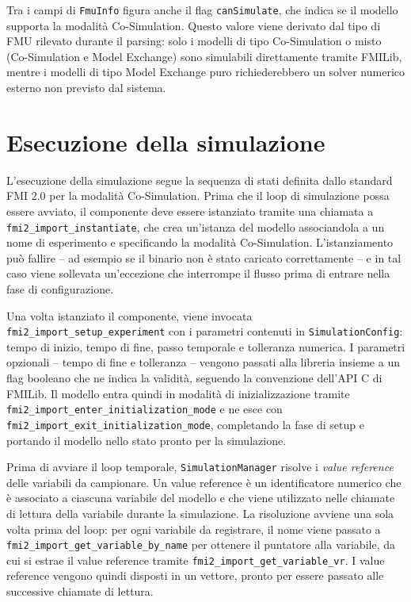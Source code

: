Tra i campi di \texttt{FmuInfo} figura anche il flag \texttt{canSimulate}, che indica se il modello supporta la modalità Co-Simulation. Questo valore viene derivato dal tipo di FMU rilevato durante il parsing: solo i modelli di tipo Co-Simulation o misto (Co-Simulation e Model Exchange) sono simulabili direttamente tramite FMILib, mentre i modelli di tipo Model Exchange puro richiederebbero un solver numerico esterno non previsto dal sistema.

\section{Esecuzione della simulazione}
\label{sec:impl-simulazione}

L'esecuzione della simulazione segue la sequenza di stati definita dallo standard FMI 2.0 per la modalità Co-Simulation. Prima che il loop di simulazione possa essere avviato, il componente deve essere istanziato tramite una chiamata a\\\texttt{fmi2\_import\_instantiate}, che crea un'istanza del modello associandola a un nome di esperimento e specificando la modalità Co-Simulation. L'istanziamento può fallire -- ad esempio se il binario non è stato caricato correttamente -- e in tal caso viene sollevata un'eccezione che interrompe il flusso prima di entrare nella fase di configurazione.

Una volta istanziato il componente, viene invocata\\\texttt{fmi2\_import\_setup\_experiment} con i parametri contenuti in \texttt{SimulationConfig}: tempo di inizio, tempo di fine, passo temporale e tolleranza numerica. I parametri opzionali -- tempo di fine e tolleranza -- vengono passati alla libreria insieme a un flag booleano che ne indica la validità, seguendo la convenzione dell'API C di FMILib. Il modello entra quindi in modalità di inizializzazione tramite \texttt{fmi2\_import\_enter\_initialization\_mode} e ne esce con\\\texttt{fmi2\_import\_exit\_initialization\_mode}, completando la fase di setup e portando il modello nello stato pronto per la simulazione.

Prima di avviare il loop temporale, \texttt{SimulationManager} risolve i \textit{value reference} delle variabili da campionare. Un value reference è un identificatore numerico che è associato a ciascuna variabile del modello e che viene utilizzato nelle chiamate di lettura della variabile durante la simulazione. La risoluzione avviene una sola volta prima del loop: per ogni variabile da registrare, il nome viene passato a \texttt{fmi2\_import\_get\_variable\_by\_name} per ottenere il puntatore alla variabile, da cui si estrae il value reference tramite \texttt{fmi2\_import\_get\_variable\_vr}. I value reference vengono quindi disposti in un vettore, pronto per essere passato alle successive chiamate di lettura.

